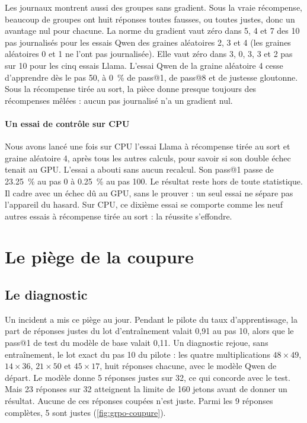 Les journaux montrent aussi des groupes sans gradient. Sous la vraie récompense, beaucoup de groupes ont huit
réponses toutes fausses, ou toutes justes, donc un avantage nul pour chacune. La norme du gradient vaut zéro
dans 5, 4 et 7 des 10 pas journalisés pour les essais Qwen des graines aléatoires 2, 3 et 4 (les graines
aléatoires 0 et 1 ne l'ont pas journalisée). Elle vaut zéro dans 3, 0, 3, 3 et 2 pas sur 10 pour les cinq
essais Llama. L'essai Qwen de la graine
aléatoire 4 cesse d'apprendre dès le pas 50, à 0~\% de pass@1, de pass@8 et de justesse gloutonne. Sous la
récompense tirée au sort, la pièce donne presque toujours des récompenses mêlées : aucun pas journalisé n'a
un gradient nul.

\paragraph{Un essai de contrôle sur CPU} Nous avons lancé une fois sur CPU l'essai Llama à récompense
tirée au sort et graine aléatoire 4, après tous les autres calculs, pour savoir si son double échec tenait au
GPU. L'essai a abouti sans aucun recalcul. Son pass@1
passe de \num{23.25}~\% au pas 0 à \num{0.25}~\% au pas 100. Le résultat reste hors de toute
statistique. Il cadre avec un échec dû au GPU, sans le prouver : un
seul essai ne sépare pas l'appareil du hasard. Sur CPU, ce dixième essai se comporte comme les neuf autres essais à récompense tirée au sort : la réussite s'effondre.

\section{Le piège de la coupure}
\label{sec:llm-coupure}

\subsection{Le diagnostic}

Un incident a mis ce piège au jour. Pendant le pilote du taux d'apprentissage, la part de
réponses justes du lot d'entraînement valait 0,91 au pas 10, alors que le pass@1 de test du modèle
de base valait 0,11. Un diagnostic rejoue,
sans entraînement, le lot exact du pas 10 du pilote : les quatre multiplications $48 \times 49$,
$14 \times 36$, $21 \times 50$ et $45 \times 17$, huit réponses chacune, avec le modèle Qwen de
départ. Le modèle donne 5 réponses justes sur 32, ce qui concorde avec le test. Mais 23 réponses sur 32
atteignent la limite de 160 jetons avant de donner un résultat. Aucune de ces réponses coupées n'est
juste. Parmi les 9 réponses complètes, 5 sont justes (\cref{fig:grpo-coupure}).

